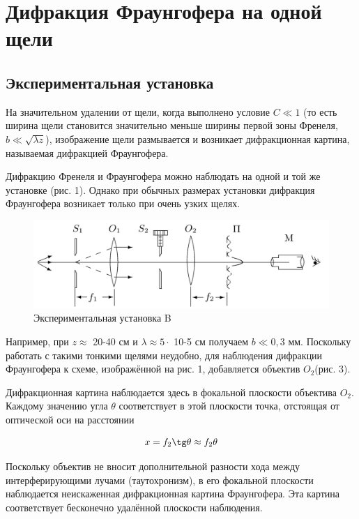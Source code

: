 \documentclass[15pt,a5paper,reqno]{article}
\begin{document}


\section{Дифракция Фраунгофера на одной щели}

	\subsection{Экспериментальная установка}
	
	На значительном удалении от щели, когда выполнено условие $ C \ll 1 $
(то есть ширина щели становится значительно меньше ширины первой
зоны Френеля, $ b \ll \sqrt{\lambda z} $), изображение щели размывается и возникает
дифракционная картина, называемая дифракцией Фраунгофера.

Дифракцию Френеля и Фраунгофера можно наблюдать на одной
и той же установке (рис. 1). Однако при обычных размерах установки дифракция Фраунгофера возникает только при очень узких щелях.

	\begin{figure}[h!]
		\centering
		\includegraphics[width=0.8\linewidth]{pics/b.png}
		\caption{Экспериментальная установка B}
		\label{labB}
	\end{figure}

Например, при $ z \approx$ 20-40 см и $ \lambda \approx 5 \cdot $ 10-5  см получаем $b \ll 0,3$ мм. Поскольку работать с такими тонкими щелями неудобно, для наблюдения дифракции Фраунгофера к схеме, изображённой на рис. 1, добавляется объектив $ O_2  $(рис. 3).

Дифракционная картина наблюдается здесь в фокальной плоскости
объектива $ O_2 $. Каждому значению угла $ \theta $ соответствует в этой плоскости точка, отстоящая от оптической оси на расстоянии

\begin{equation}\label{x}
x = f_2 \tg \theta \approx f_2 \theta
\end{equation}

Поскольку объектив не вносит дополнительной разности хода
между интерферирующими лучами (таутохронизм), в его фокальной
плоскости наблюдается неискаженная дифракционная картина Фраунгофера. Эта картина соответствует бесконечно удалённой плоскости
наблюдения.
\end{document}

